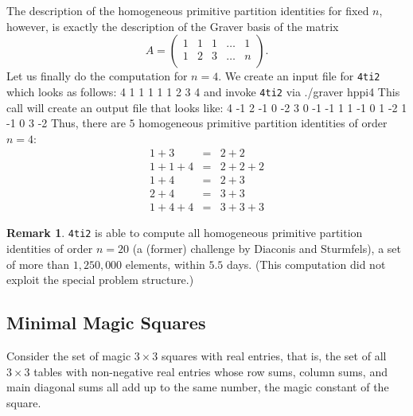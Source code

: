 \documentclass[12pt]{article}
\newenvironment{myverbatim}%
  {\quote\verbatim}%
  {\endverbatim\endquote}
\newcommand\File{\begingroup \urlstyle{sf}\Url}
\theoremstyle{definition}
\newtheorem*{Remark}{Remark}
\newcommand{\FourTiTwo}{{\tt 4ti2}}
\begin{document}
The description of the homogeneous primitive partition identities for
fixed $n$, however, is exactly the description of the Graver basis of
the matrix 
\[
A=
\left(
\begin{array}{ccccc}
 1 & 1 & 1 & \ldots & 1 \\ 
 1 & 2 & 3 & \ldots & n \\ 
\end{array}
\right).
\]
Let us finally do the computation for $n=4$. We create an input file
\File{hppi4} for \FourTiTwo{} which looks as follows: 
\begin{myverbatim}
2 4
1 1 1 1
1 2 3 4
\end{myverbatim}
and invoke \FourTiTwo{} via
\begin{myverbatim}
./graver hppi4
\end{myverbatim}
This call will create an output file \File{hppi4.gra} that looks
like:
\begin{myverbatim}
5 4
-1 2 -1  0
-2 3  0 -1
-1 1  1 -1
 0 1 -2  1
-1 0  3 -2
\end{myverbatim}
Thus, there are $5$ homogeneous primitive partition identities of
order $n=4$:
\begin{eqnarray*}
1+3   & = & 2+2\\
1+1+4 & = & 2+2+2\\
1+4   & = & 2+3\\
2+4   & = & 3+3\\
1+4+4 & = & 3+3+3
\end{eqnarray*}

\begin{Remark}
  \FourTiTwo{} is able to compute all homogeneous primitive partition
  identities of order $n=20$ (a (former) challenge by Diaconis and
  Sturmfels), a set of more than $1,250,000$ elements, within $5.5$
  days. (This computation did not exploit
  the special problem structure.)
\end{Remark}







\subsection{Minimal Magic Squares}
Consider the set of magic $3\times 3$ squares with real entries, that
is, the set of all $3\times 3$ tables with non-negative real entries
whose row sums, column sums, and main diagonal sums all add up to the same
number, the magic constant of the square. 
\end{document}
